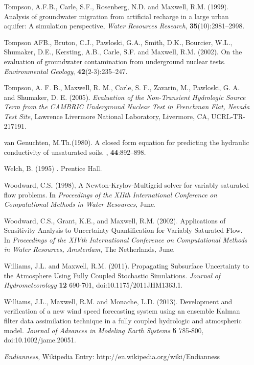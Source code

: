 \begin{thebibliography}{999}
  Tompson, A.F.B., Carle, S.F., Rosenberg, N.D. and Maxwell, R.M. 
 (1999). Analysis of groundwater migration from artificial recharge in a large
 urban aquifer: A simulation perspective, {\em Water Resources
Research}, {\bf 35}(10):2981--2998.

Tompson AFB., Bruton, C.J., Pawloski, G.A., Smith, D.K., Bourcier, W.L., Shumaker, D.E., Kersting, A.B., Carle, S.F. and Maxwell, R.M. (2002). On the evaluation of groundwater contamination from underground nuclear tests.  {\em Environmental Geology}, {\bf 42}(2-3):235--247.

Tompson, A. F. B., Maxwell, R. M., Carle, S. F., Zavarin, M., Pawloski, G. A. and Shumaker, D. E. (2005). {\em Evaluation of the Non-Transient Hydrologic Source Term from the CAMBRIC Underground Nuclear Test in Frenchman Flat, Nevada Test Site}, Lawrence Livermore National Laboratory, Livermore, CA, UCRL-TR-217191.

{van Genuchten}, M.Th.(1980). 
\newblock A closed form equation for predicting the hydraulic conductivity of
  unsaturated soils.
, {\bf 44}:892--898.

Welch, B. (1995)
.
\newblock Prentice Hall.

Woodward, C.S. (1998),
\newblock A {N}ewton-{K}rylov-{M}ultigrid solver for variably saturated flow
  problems.
\newblock In {\em Proceedings of the XIIth International Conference on
  Computational Methods in Water Resources}, June.

Woodward, C.S., Grant,  K.E., and Maxwell, R.M. (2002). Applications of Sensitivity Analysis to Uncertainty Quantification for Variably Saturated Flow.
\newblock In {\em Proceedings of the XIVth International Conference on Computational Methods in Water Resources, Amsterdam}, The Netherlands, June.

Williams, J.L. and Maxwell, R.M. (2011). Propagating Subsurface Uncertainty to the Atmosphere Using Fully Coupled Stochastic Simulations. {\em Journal of Hydrometeorology} {\bf 12} 690-701, doi:10.1175/2011JHM1363.1.

Williams, J.L., Maxwell, R.M. and Monache, L.D. (2013). Development and verification of a new wind speed forecasting system using an ensemble Kalman filter data assimilation technique in a fully coupled hydrologic and atmospheric model. {\em Journal of Advances in Modeling Earth Systems} {\bf 5} 785-800, doi:10.1002/jame.20051.

{\em Endianness}, Wikipedia Entry: http://en.wikipedia.org/wiki/Endianness



\end{thebibliography}
